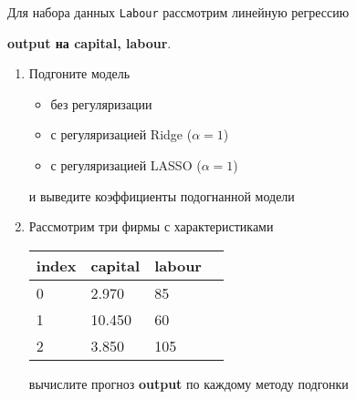 \begin{exercise}
Для набора данных \texttt{Labour} рассмотрим линейную регрессию 
\begin{center}
	\textbf{output на capital, labour}.
\end{center}
\begin{enumerate}
	\item Подгоните модель
	\begin{itemize}
		\item без регуляризации
		\item с регуляризацией Ridge (\(\alpha=1\))
		\item с регуляризацией LASSO (\(\alpha=1\))
	\end{itemize}
	и выведите коэффициенты подогнанной модели
	\item Рассмотрим три фирмы с характеристиками
	\begin{center}
		\begin{tabular}{|l||l||l|l|}\hline
			index & capital & labour \\ \hline\hline
			0 & 2.970 & 85 \\
			1 & 10.450 & 60  \\
			2 & 3.850 & 105 \\ \hline
		\end{tabular}
	\end{center}
	вычислите прогноз \textbf{output} по каждому методу подгонки
\end{enumerate}
\end{exercise}

